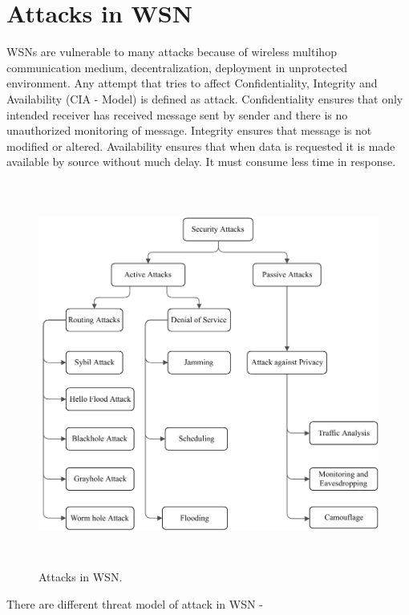 \section{Attacks in WSN} \label{S2.2}
WSNs are vulnerable to many attacks because of wireless multihop communication medium, decentralization, deployment in unprotected environment. Any attempt that tries to affect Confidentiality, Integrity and Availability (CIA - Model) is defined as attack. Confidentiality ensures that only intended receiver has received message sent by sender and there is no unauthorized monitoring of message. Integrity ensures that message is not modified or altered. Availability ensures that when data is requested it is made available by source without much delay. It must consume less time in response.
\begin{figure}[h]
\center	
\includegraphics[width=5in, height=5in]{Figures/PDF/WSN-attacks.pdf}
\caption{Attacks in WSN.}
\label{WSN-Attacks}	
\end{figure}
\noindent
There are different threat model of attack in WSN \cite{roosta2006taxonomy}- \\
